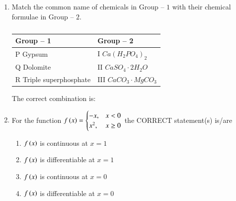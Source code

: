 \documentclass[journal,12pt,onecolumn]{IEEEtran}
\theoremstyle{remark}
\begin{document}
\begin{enumerate}
\item Match the common name of chemicals in Group -- $1$ with their chemical formulae in Group -- $2$.

\hfill{}

\begin{table}[h!]
\centering
\begin{tabular}{|l|l|}
\hline
Group -- 1 & Group -- 2 \\
\hline
P Gypsum & I $Ca(H_2PO_4)_2$ \\
\hline
Q Dolomite & II $CaSO_4 \cdot 2H_2O$ \\
\hline
R Triple superphosphate & III $CaCO_3 \cdot MgCO_3$ \\
\hline
\end{tabular}
\caption*{}
\label{tab:Q15}
\end{table}

The correct combination is:
\begin{enumerate}
\end{enumerate}

\item For the function $f\left(x\right) = \begin{cases} -x, & x < 0 \\ x^2, & x \ge 0 \end{cases}$ the CORRECT statement(s) is/are

\hfill{}

\begin{enumerate}
\item $f\left(x\right)$ is continuous at $x=1$
\item $f\left(x\right)$ is differentiable at $x=1$
\item $f\left(x\right)$ is continuous at $x=0$
\item $f\left(x\right)$ is differentiable at $x=0$
\end{enumerate}


\end{enumerate}
\end{document}
